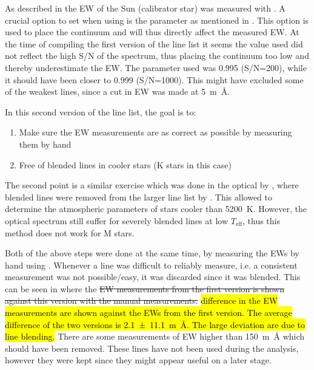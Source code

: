 As described in  the EW of the Sun (calibrator star) was measured with
. A crucial option to set when using  is the  parameter as
mentioned in . This option is used to place the continuum and will thus directly
affect the measured EW. At the time of compiling the first version of the line list it seems the
 value used did not reflect the high S/N of the spectrum, thus placing the continuum too
low and thereby underestimate the EW. The  parameter used was 0.995 (S/N=200), while it
should have been closer to 0.999 (S/N=1000). This might have excluded some of the weakest lines,
since a cut in EW was made at \SI{5}{m\angstrom}.

In this second version of the line list, the goal is to:
\begin{enumerate}
  \item Make sure the EW measurements are as correct as possible by measuring them by hand
  \item Free of blended lines in cooler stars (K stars in this case)
\end{enumerate}
The second point is a similar exercise which was done in the optical by \citet{Tsantaki2013}, where
blended lines were removed from the larger line list by \citet{Sousa2008a}. This allowed to
determine the atmospheric parameters of stars cooler than \SI{5200}{K}. However, the optical
spectrum still suffer for severely blended lines at low $T_\mathrm{eff}$, thus this method does not
work for M stars.

Both of the above steps were done at the same time, by measuring the EWs by hand using .
Whenever a line was difficult to reliably measure, i.e. a consistent measurement was not
possible/easy, it was discarded since it was blended. This can be seen in
 where the \st{EW measurements from the first version is shown against
this version with the manual measurements.} \hl{difference in the EW measurements are shown against
the EWs from the first version. The average difference of the two versions is
\SI{2.1+-11.1}{m\angstrom}. The large deviation are due to line blending.} There are some
measurements of EW higher than \SI{150}{m\angstrom} which should have been removed. These lines have
not been used during the analysis, however they were kept since they might appear useful on a later
stage.

